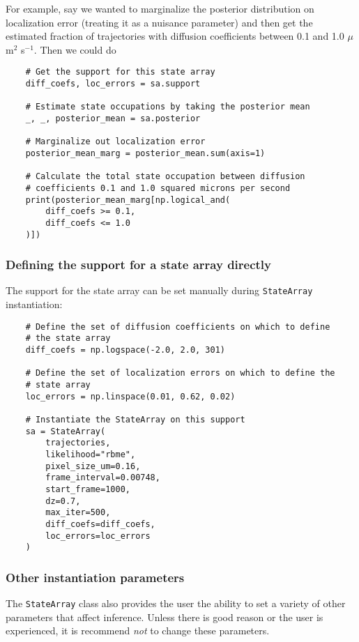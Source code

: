 \documentclass{article}
\begin{document}
For example, say we wanted to marginalize the posterior distribution on 
localization error (treating it as a nuisance parameter) and then get the
estimated fraction of trajectories with diffusion coefficients between 
0.1 and 1.0 $\mu$m$^{2}$ s$^{-1}$. Then we could do
\begin{verbatim}
    # Get the support for this state array
    diff_coefs, loc_errors = sa.support

    # Estimate state occupations by taking the posterior mean
    _, _, posterior_mean = sa.posterior

    # Marginalize out localization error
    posterior_mean_marg = posterior_mean.sum(axis=1)

    # Calculate the total state occupation between diffusion 
    # coefficients 0.1 and 1.0 squared microns per second
    print(posterior_mean_marg[np.logical_and(
        diff_coefs >= 0.1,
        diff_coefs <= 1.0
    )])
\end{verbatim}

\subsubsection{Defining the support for a state array directly}

The support for the state array can be set manually during 
\verb|StateArray| instantiation:
\begin{verbatim}
    # Define the set of diffusion coefficients on which to define
    # the state array
    diff_coefs = np.logspace(-2.0, 2.0, 301)
    
    # Define the set of localization errors on which to define the 
    # state array
    loc_errors = np.linspace(0.01, 0.62, 0.02)
    
    # Instantiate the StateArray on this support
    sa = StateArray(
        trajectories,
        likelihood="rbme",
        pixel_size_um=0.16,
        frame_interval=0.00748,
        start_frame=1000,
        dz=0.7,
        max_iter=500,
        diff_coefs=diff_coefs,
        loc_errors=loc_errors
    )
\end{verbatim}

\subsubsection{Other instantiation parameters}\label{sect:other_params}

The \verb|StateArray| class also provides the user the ability to set 
a variety of other parameters that affect inference. Unless there is 
good reason or the user is experienced, it is recommend \emph{not} to 
change these parameters.
\end{document}
